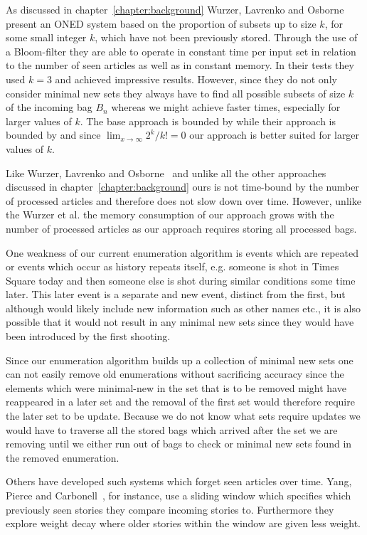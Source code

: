 As discussed in chapter~\ref{chapter:background} Wurzer, Lavrenko and Osborne~\cite{wurzer2015kterm} present an ONED system based on the proportion of subsets up to size $k$, for some small integer $k$, which have not been previously stored. Through the use of a Bloom-filter they are able to operate in constant time per input set in relation to the number of seen articles as well as in constant memory. In their tests they used $k=3$ and achieved impressive results. However, since they do not only consider minimal new sets they always have to find all possible subsets of size $k$ of the incoming bag $B_{n}$ whereas we might achieve faster times, especially for larger values of $k$. The base approach is bounded by  while their approach is bounded by  and since $\lim_{x \to \infty}2^{k}/k!=0$ our approach is better suited for larger values of $k$. 

Like Wurzer, Lavrenko and Osborne~\cite{wurzer2015kterm} and unlike all the other approaches discussed in chapter~\ref{chapter:background} ours is not time-bound by the number of processed articles and therefore does not slow down over time. However, unlike the Wurzer et al. the memory consumption of our approach grows with the number of processed articles as our approach requires storing all processed bags. 

One weakness of our current enumeration algorithm is events which are repeated or events which occur as history repeats itself, e.g. someone is shot in Times Square today and then someone else is shot during similar conditions some time later. This later event is a separate and new event, distinct from the first, but although would likely include new information such as other names etc., it is also possible that it would not result in any minimal new sets since they would have been introduced by the first shooting.

Since our enumeration algorithm builds up a collection of minimal new sets one can not easily remove old enumerations without sacrificing accuracy since the elements which were minimal-new in the set that is to be removed might have reappeared in a later set and the removal of the first set would therefore require the later set to be update. Because we do not know what sets require updates we would have to traverse all the stored bags which arrived after the set we are removing until we either run out of bags to check or minimal new sets found in the removed enumeration.

Others have developed such systems which forget seen articles over time. Yang, Pierce and Carbonell~\cite{yang1998study}, for instance, use a sliding window which specifies which previously seen stories they compare incoming stories to. Furthermore they explore weight decay where older stories within the window are given less weight.

